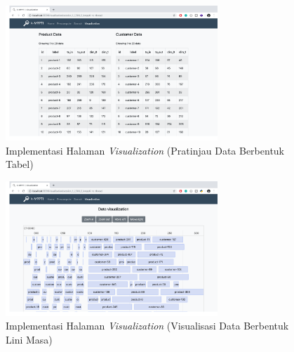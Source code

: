 \begin{figure}[H]
	\centering
	\includegraphics[width=8cm]{assets/img/bab4/visual-table.png}
	\caption{Implementasi Halaman \textit{Visualization} (Pratinjau Data Berbentuk Tabel)}
	\label{fig:visual-table}
\end{figure}

\begin{figure}[H]
	\centering
	\includegraphics[width=8cm]{assets/img/bab4/visual-timeline.png}
	\caption{Implementasi Halaman \textit{Visualization} (Visualisasi Data Berbentuk Lini Masa)}
	\label{fig:visual-timeline}
\end{figure}